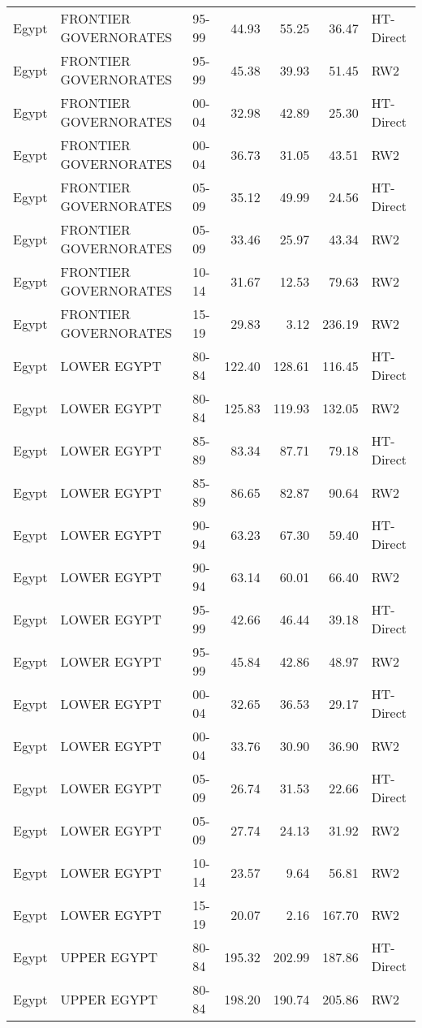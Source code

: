 \begin{longtable}{lllrrrl}
  Egypt & FRONTIER GOVERNORATES & 95-99 & 44.93 & 55.25 & 36.47 & HT-Direct \\ 
  Egypt & FRONTIER GOVERNORATES & 95-99 & 45.38 & 39.93 & 51.45 & RW2 \\ 
  Egypt & FRONTIER GOVERNORATES & 00-04 & 32.98 & 42.89 & 25.30 & HT-Direct \\ 
  Egypt & FRONTIER GOVERNORATES & 00-04 & 36.73 & 31.05 & 43.51 & RW2 \\ 
  Egypt & FRONTIER GOVERNORATES & 05-09 & 35.12 & 49.99 & 24.56 & HT-Direct \\ 
  Egypt & FRONTIER GOVERNORATES & 05-09 & 33.46 & 25.97 & 43.34 & RW2 \\ 
  Egypt & FRONTIER GOVERNORATES & 10-14 & 31.67 & 12.53 & 79.63 & RW2 \\ 
  Egypt & FRONTIER GOVERNORATES & 15-19 & 29.83 & 3.12 & 236.19 & RW2 \\ 
  Egypt & LOWER EGYPT & 80-84 & 122.40 & 128.61 & 116.45 & HT-Direct \\ 
  Egypt & LOWER EGYPT & 80-84 & 125.83 & 119.93 & 132.05 & RW2 \\ 
  Egypt & LOWER EGYPT & 85-89 & 83.34 & 87.71 & 79.18 & HT-Direct \\ 
  Egypt & LOWER EGYPT & 85-89 & 86.65 & 82.87 & 90.64 & RW2 \\ 
  Egypt & LOWER EGYPT & 90-94 & 63.23 & 67.30 & 59.40 & HT-Direct \\ 
  Egypt & LOWER EGYPT & 90-94 & 63.14 & 60.01 & 66.40 & RW2 \\ 
  Egypt & LOWER EGYPT & 95-99 & 42.66 & 46.44 & 39.18 & HT-Direct \\ 
  Egypt & LOWER EGYPT & 95-99 & 45.84 & 42.86 & 48.97 & RW2 \\ 
  Egypt & LOWER EGYPT & 00-04 & 32.65 & 36.53 & 29.17 & HT-Direct \\ 
  Egypt & LOWER EGYPT & 00-04 & 33.76 & 30.90 & 36.90 & RW2 \\ 
  Egypt & LOWER EGYPT & 05-09 & 26.74 & 31.53 & 22.66 & HT-Direct \\ 
  Egypt & LOWER EGYPT & 05-09 & 27.74 & 24.13 & 31.92 & RW2 \\ 
  Egypt & LOWER EGYPT & 10-14 & 23.57 & 9.64 & 56.81 & RW2 \\ 
  Egypt & LOWER EGYPT & 15-19 & 20.07 & 2.16 & 167.70 & RW2 \\ 
  Egypt & UPPER EGYPT & 80-84 & 195.32 & 202.99 & 187.86 & HT-Direct \\ 
  Egypt & UPPER EGYPT & 80-84 & 198.20 & 190.74 & 205.86 & RW2 \\ 

\end{longtable}
